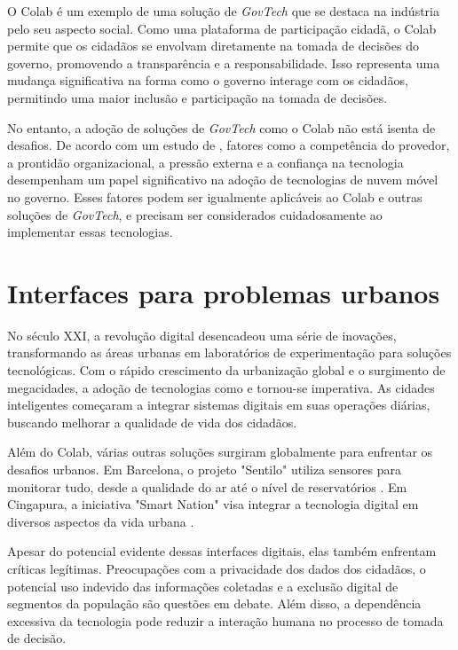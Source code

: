O Colab é um exemplo de uma solução de \textit{GovTech} que se destaca na indústria pelo seu aspecto social. Como uma plataforma de participação cidadã, o Colab permite que os cidadãos se envolvam diretamente na tomada de decisões do governo, promovendo a transparência e a responsabilidade. Isso representa uma mudança significativa na forma como o governo interage com os cidadãos, permitindo uma maior inclusão e participação na tomada de decisões.

No entanto, a adoção de soluções de \textit{GovTech} como o Colab não está isenta de desafios. De acordo com um estudo de , fatores como a competência do provedor, a prontidão organizacional, a pressão externa e a confiança na tecnologia desempenham um papel significativo na adoção de tecnologias de nuvem móvel no governo. Esses fatores podem ser igualmente aplicáveis ao Colab e outras soluções de \textit{GovTech}, e precisam ser considerados cuidadosamente ao implementar essas tecnologias.

\section{Interfaces para problemas urbanos}

No século XXI, a revolução digital desencadeou uma série de inovações, transformando as áreas urbanas em laboratórios de experimentação para soluções tecnológicas. Com o rápido crescimento da urbanização global e o surgimento de megacidades, a adoção de tecnologias como  e  tornou-se imperativa. As cidades inteligentes começaram a integrar sistemas digitais em suas operações diárias, buscando melhorar a qualidade de vida dos cidadãos.

Além do Colab, várias outras soluções surgiram globalmente para enfrentar os desafios urbanos. Em Barcelona, o projeto "Sentilo" utiliza sensores para monitorar tudo, desde a qualidade do ar até o nível de reservatórios \cite{2016_Sinaee_IP}. Em Cingapura, a iniciativa "Smart Nation" visa integrar a tecnologia digital em diversos aspectos da vida urbana \cite{2016_Chia_IP}.

Apesar do potencial evidente dessas interfaces digitais, elas também enfrentam críticas legítimas. Preocupações com a privacidade dos dados dos cidadãos, o potencial uso indevido das informações coletadas e a exclusão digital de segmentos da população são questões em debate. Além disso, a dependência excessiva da tecnologia pode reduzir a interação humana no processo de tomada de decisão.

